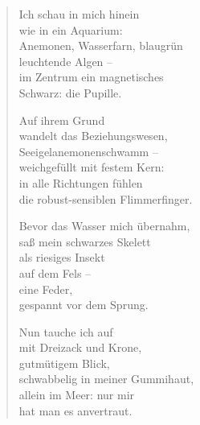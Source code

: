 
\cleartoverso


\vspace*{-\baselineskip}
\begin{verse}

Ich schau in mich hinein\\
wie in ein Aquarium:\\
Anemonen, Wasserfarn, blaugrün\\
leuchtende Algen --\\
im Zentrum ein magnetisches\\
Schwarz: die Pupille.

Auf ihrem Grund\\
wandelt das Beziehungswesen,\\
Seeigelanemonenschwamm --\\
weichgefüllt mit festem Kern:\\
in alle Richtungen fühlen\\
die robust-sensiblen Flimmerfinger.

Bevor das Wasser mich übernahm,\\
saß mein schwarzes Skelett\\
als riesiges Insekt\\
auf dem Fels --\\
eine Feder,\\
gespannt vor dem Sprung.

Nun tauche ich auf\\
mit Dreizack und Krone,\\
gutmütigem Blick,\\
schwabbelig in meiner Gummihaut,\\
allein im Meer: nur mir\\
hat man es anvertraut.

\end{verse}

\clearpage


